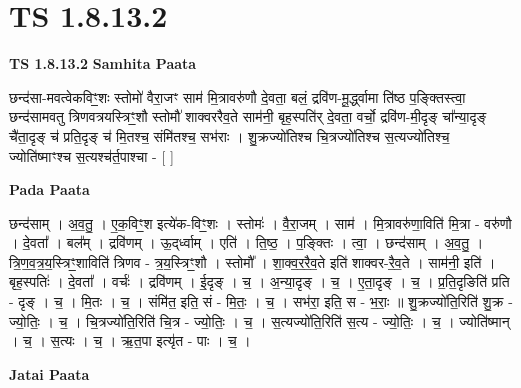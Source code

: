 \documentclass[17pt]{extarticle}
\begin{document}
\section*{ TS 1.8.13.2 }

\textbf{TS 1.8.13.2 } \newline
\textbf{Samhita Paata} \newline

छन्द॑सा-मवत्वेकविꣳ॒॒शः स्तोमो॑ वैरा॒जꣳ साम॑ मि॒त्रावरु॑णौ दे॒वता॒ बलं॒ द्रवि॑ण-मू॒र्द्ध्वामा ति॑ष्ठ प॒ङ्क्तिस्त्वा॒ छन्द॑सामवतु त्रिणवत्रयस्त्रिꣳ॒॒शौ स्तोमौ॑ शाक्वररैव॒ते साम॑नी॒ बृह॒स्पति॑र् दे॒वता॒ वर्चो॒ द्रवि॑ण-मी॒दृङ् चा᳚न्या॒दृङ् चै॑ता॒दृङ् च॑ प्रति॒दृङ् च॑ मि॒तश्च॒ संमि॑तश्च॒ सभ॑राः । शु॒क्रज्यो॑तिश्च चि॒त्रज्यो॑तिश्च स॒त्यज्यो॑तिश्च॒ ज्योति॑ष्माꣳश्च स॒त्यश्च॑र्त॒पाश्चा - [ ] \newline

\textbf{Pada Paata} \newline

छन्द॑साम् । अ॒व॒तु॒ । ए॒क॒विꣳ॒॒श इत्ये॑क-विꣳ॒॒शः । स्तोमः॑ । वै॒रा॒जम् । साम॑ । मि॒त्रावरु॑णा॒विति॑ मि॒त्रा - वरु॑णौ । दे॒वता᳚ । बल᳚म् । द्रवि॑णम् । ऊ॒द्‌र्ध्वाम् । एति॑ । ति॒ष्ठ॒ । प॒ङ्क्तिः । त्वा॒ । छन्द॑साम् । अ॒व॒तु॒ । त्रि॒ण॒व॒त्र॒य॒स्त्रिꣳ॒॒शाविति॑ त्रिणव - त्र॒य॒स्त्रिꣳ॒॒शौ । स्तोमौ᳚ । शा॒क्व॒र॒रै॒व॒ते इति॑ शाक्वर-रै॒व॒ते । साम॑नी॒ इति॑ । बृह॒स्पतिः॑ । दे॒वता᳚ । वर्चः॑ । द्रवि॑णम् । ई॒दृङ् । च॒ । अ॒न्या॒दृङ् । च॒ । ए॒ता॒दृङ् । च॒ । प्र॒ति॒दृङिति॑ प्रति - दृङ् । च॒ । मि॒तः । च॒ । संमि॑त॒ इति॒ सं - मि॒तः॒ । च॒ । सभ॑रा॒ इति॒ स - भ॒राः॒ ॥ शु॒क्रज्यो॑ति॒रिति॑ शु॒क्र - ज्यो॒तिः॒ । च॒ । चि॒त्रज्यो॑ति॒रिति॑ चि॒त्र - ज्यो॒तिः॒ । च॒ । स॒त्यज्यो॑ति॒रिति॑ स॒त्य - ज्यो॒तिः॒ । च॒ । ज्योति॑ष्मान् । च॒ । स॒त्यः । च॒ । ऋ॒त॒पा इत्यृ॑त - पाः । च॒ ।  \newline



\textbf{Jatai Paata} \newline
\end{document}
